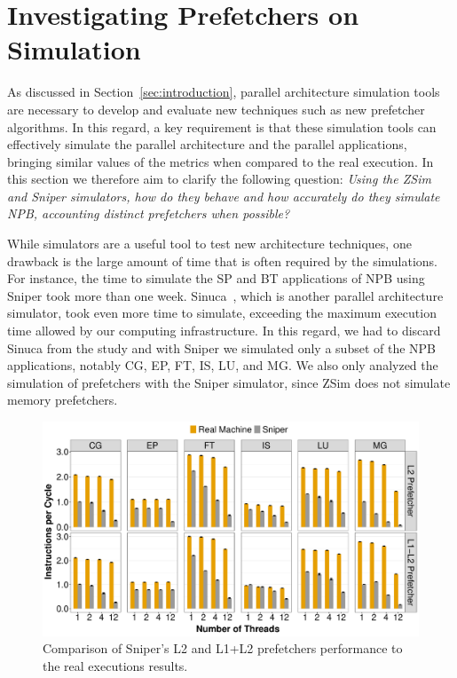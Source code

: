 \documentclass[AMA,final,STIX1COL]{WileyNJD-v2}
\begin{document}
\section{Investigating Prefetchers on Simulation}\label{sec:simulation}

As discussed in Section~\ref{sec:introduction}, parallel architecture simulation tools are necessary to develop and evaluate new techniques such as new prefetcher algorithms. In this regard, a key requirement is that these simulation tools can effectively simulate the parallel architecture and the parallel applications, bringing similar values of the metrics when compared to the real execution. In this section we therefore aim to clarify the following question: \textit{Using the ZSim and Sniper simulators, how do they behave and how accurately do they simulate NPB, accounting distinct prefetchers when possible?}

While simulators are a useful tool to test new architecture techniques, one drawback is the large amount of time that is often required by the simulations. For instance, the time to simulate the SP and BT applications of NPB using Sniper took more than one week. Sinuca~\cite{alves2015sinuca}, which is another parallel architecture simulator, took even more time to simulate, exceeding the maximum execution time allowed by our computing infrastructure. In this regard, we had to discard Sinuca from the study and with Sniper we simulated only a subset of the NPB applications, notably CG, EP, FT, IS, LU, and MG. 
We also only analyzed the simulation of prefetchers with the Sniper simulator, since ZSim does not simulate memory prefetchers. 



\begin{figure}[b]
    \centering
    \includegraphics[width=\linewidth]{figures/fig88.pdf}
    \caption{Comparison of Sniper's L2 and L1+L2 prefetchers performance to the real executions results.}
    \label{fig:sniper_l2}
\end{figure}
\end{document}
